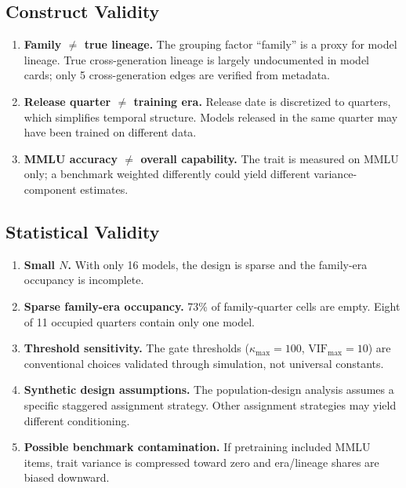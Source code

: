 \documentclass{ieeeaccess}
\theoremstyle{definition}
\theoremstyle{plain}
\begin{document}
\subsection{Construct Validity}
\begin{enumerate}
\item \textbf{Family $\neq$ true lineage.} The grouping factor ``family'' is a proxy for model lineage. True cross-generation lineage is largely undocumented in model cards; only 5 cross-generation edges are verified from metadata.
\item \textbf{Release quarter $\neq$ training era.} Release date is discretized to quarters, which simplifies temporal structure. Models released in the same quarter may have been trained on different data.
\item \textbf{MMLU accuracy $\neq$ overall capability.} The trait is measured on MMLU only; a benchmark weighted differently could yield different variance-component estimates.
\end{enumerate}

\subsection{Statistical Validity}
\begin{enumerate}
\item \textbf{Small $N$.} With only 16 models, the design is sparse and the family-era occupancy is incomplete.
\item \textbf{Sparse family-era occupancy.} 73\% of family-quarter cells are empty. Eight of 11 occupied quarters contain only one model.
\item \textbf{Threshold sensitivity.} The gate thresholds ($\kappa_{\max} = 100$, $\text{VIF}_{\max} = 10$) are conventional choices validated through simulation, not universal constants.
\item \textbf{Synthetic design assumptions.} The population-design analysis assumes a specific staggered assignment strategy. Other assignment strategies may yield different conditioning.
\item \textbf{Possible benchmark contamination.} If pretraining included MMLU items, trait variance is compressed toward zero and era/lineage shares are biased downward.
\end{enumerate}
\end{document}
